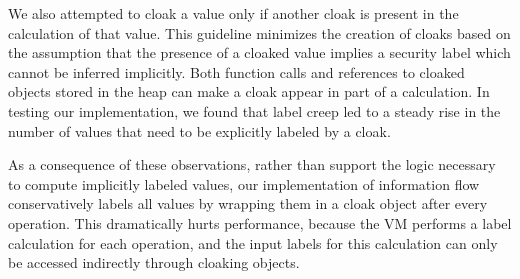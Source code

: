 \documentclass[11pt,onecolumn]{article}
\begin{document}
We also attempted to cloak a value only if another cloak is present in the calculation of that value.
This guideline minimizes the creation of cloaks based on the assumption that the presence of a cloaked value implies a security label which cannot be inferred implicitly.
Both function calls and references to cloaked objects stored in the heap can make a cloak appear in part of a calculation.
In testing our implementation, we found that label creep led to a steady rise in the number of values that need to be explicitly labeled by a cloak.

As a consequence of these observations, rather than support the logic necessary to compute implicitly labeled values, our implementation of information flow conservatively labels all values by wrapping them in a cloak object after every operation.
This dramatically hurts performance, because the VM performs a label calculation for each operation, and the input labels for this calculation can only be accessed indirectly through cloaking objects.
\end{document}
